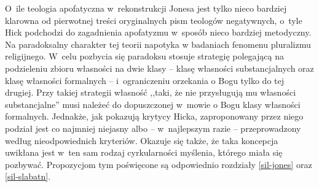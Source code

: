 O~ile teologia apofatyczna w~rekonstrukcji Jonesa jest tylko nieco bardziej klarowna od pierwotnej treści oryginalnych pism teologów negatywnych, o~tyle Hick podchodzi do zagadnienia apofatyzmu w~sposób nieco bardziej metodyczny.
Na paradoksalny charakter tej teorii napotyka w badaniach fenomenu pluralizmu religijnego. W~celu pozbycia się paradoksu stosuje strategię polegającą na podzieleniu zbioru własności na dwie klasy -- klasę własności substancjalnych oraz klasę własności formalnych --  i~ograniczeniu orzekania o Bogu tylko do tej drugiej. Przy takiej strategii własność ,,taki, że nie przysługują mu własności substancjalne'' musi należeć do  dopuszczonej w~mowie o Bogu klasy własności formalnych. Jednakże, jak pokazują krytycy Hicka, zaproponowany przez niego podział jest co najmniej niejasny albo -- w~najlepszym razie -- przeprowadzony według nieodpowiednich kryteriów. Okazuje się także, że taka koncepcja uwikłana jest w~ten sam rodzaj cyrkularności myślenia, którego miała się pozbywać.
Propozycjom tym poświęcone są odpowiednio rozdziały \ref{sil-jones} oraz \ref{sil-slabatn}.

